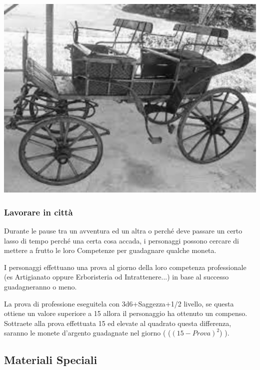 \begin{multicols}{2}


\begin{center}
\includegraphics[width=0.8\linewidth]{immagini/carrozza.png}
\end{center}


\subsubsection{Lavorare in città}

Durante le pause tra un avventura ed un altra o perché deve passare un certo lasso di tempo perché una certa cosa accada, i personaggi possono cercare di mettere a frutto le loro Competenze per guadagnare qualche moneta.

I personaggi effettuano una prova al giorno della loro competenza professionale (es Artigianato oppure Erboristeria od Intrattenere...) in base al successo guadagneranno o meno.

La prova di professione eseguitela con 3d6+Saggezza+1/2 livello, se questa ottiene un valore superiore a 15 allora il personaggio ha ottenuto un compenso. Sottraete alla prova effettuata 15 ed elevate al quadrato questa differenza, saranno le monete d'argento guadagnate nel giorno ( ($(15-Prova)^2$) ).

\end{multicols}

\pagebreak

\subsection{Materiali Speciali}

